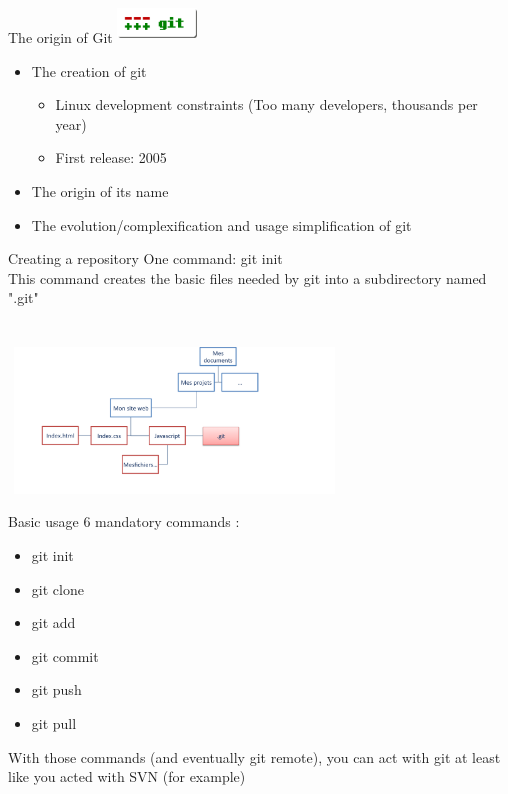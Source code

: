 \documentclass{beamer}
\begin{document}
\begin{frame}{The origin of Git}
    \includegraphics[width=60pt,height=30pt]{git-scm-logo.png}
    \begin{itemize}
        \item The creation of git
        \begin{itemize}
            \item Linux development constraints (Too many developers, thousands per year)
            \item First release: 2005
        \end{itemize}
        \pause
        \item The origin of its name
        \pause
        \item The evolution/complexification and usage simplification of git
    \end{itemize}
\end{frame}

\begin{frame}{Creating a repository}
    One command: git init\\
    This command creates the basic files needed by git into a subdirectory named ".git" \\
    \ \\
    \ \\
    \includegraphics[width=250pt,height=110pt]{fileinit.png}
\end{frame}

\begin{frame}{Basic usage}
    6 mandatory commands : \\
    \begin{itemize}
        \item git init
        \item git clone
        \item git add
        \item git commit
        \item git push
        \item git pull
    \end{itemize}
    With those commands (and eventually git remote), you can act with git at least like you acted with SVN (for example)
\end{frame}
\end{document}
